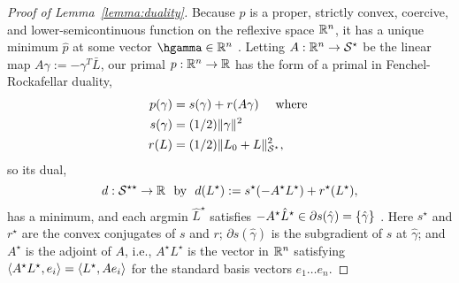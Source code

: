 \begin{proof}[Proof of Lemma~\ref{lemma:duality}]
Because $p$ is a proper, strictly convex, coercive, and lower-semicontinuous function on the reflexive space $\mathbb{R}^n$,
it has a unique minimum $\hat p$ at some vector $\hgamma \in \R^n$ \citep[Corollary 2.20]{peypouquet2015convex}. 
Letting $A:\mathbb{R}^n \to \mathcal{S}^{\star}$ be the linear map $A \gamma := -\gamma^T\bar L$,
our primal $p:\mathbb{R}^n \to \mathbb{R}$ has the form of a primal in Fenchel-Rockafellar duality,
\begin{align*}
p(\gamma) &= s(\gamma) + r(A \gamma) \quad \text{ where } \\
s(\gamma) &=  (1/2)\lVert\gamma\rVert^2 \\
r(L) &= (1/2)\lVert L_0 + L\rVert_{\mathcal{S}^{\star}}^2,
\end{align*}
so its dual,
\[  d:\S^{\star\star} \to \R\ \text{ by }\ d(L^{\star}) := s^{\star}(-A^{\star}L^{\star}) + r^{\star}(L^{\star}), \]
has a minimum, and each argmin $\hat L^{\star}$ satisfies $-A^{\star}\hat L^{\star} \in \partial s(\hat \gamma) = \{ \hat \gamma \}$ \citep[Theorem 3.51]{peypouquet2015convex}. Here $s^{\star}$ and $r^{\star}$ are the convex conjugates of $s$ and $r$; $\partial s(\hat \gamma)$ is the subgradient of $s$ at $\hat \gamma$; and 
$A^{\star}$ is the adjoint of $A$, i.e., $A^{\star} L^{\star}$ is the vector in $\mathbb{R}^n$  
satisfying  $\langle A^{\star} L^{\star}, e_i\rangle = \langle L^{\star}, A e_i\rangle$ for the standard basis vectors $e_1 \ldots e_n$.



\end{proof}
